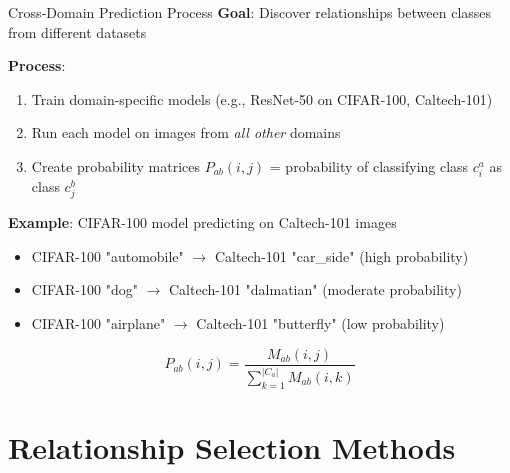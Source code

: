 \documentclass[aspectratio=169]{beamer}
\begin{document}
\begin{frame}{Cross-Domain Prediction Process}
    \textbf{Goal}: Discover relationships between classes from different datasets

    \vspace{0.5em}

    \textbf{Process}:
    \begin{enumerate}
        \item Train domain-specific models (e.g., ResNet-50 on CIFAR-100, Caltech-101)
        \item Run each model on images from \emph{all other} domains
        \item Create probability matrices $P_{ab}(i,j)$ = probability of classifying class $c_i^a$ as class $c_j^b$
    \end{enumerate}

    \vspace{0.5em}

    \textbf{Example}: CIFAR-100 model predicting on Caltech-101 images
    \begin{itemize}
        \item CIFAR-100 "automobile" $\rightarrow$ Caltech-101 "car\_side" (high probability)
        \item CIFAR-100 "dog" $\rightarrow$ Caltech-101 "dalmatian" (moderate probability)
        \item CIFAR-100 "airplane" $\rightarrow$ Caltech-101 "butterfly" (low probability)
    \end{itemize}

    \vspace{0.5em}

    \begin{equation}
        P_{ab}(i, j) = \frac{M_{ab}(i, j)}{\sum_{k=1}^{|C_a|} M_{ab}(i, k)}
    \end{equation}
\end{frame}

\section{Relationship Selection Methods}
\end{document}
